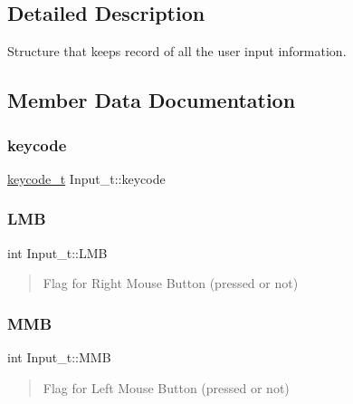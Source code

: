 \subsection{Detailed Description}
Structure that keeps record of all the user input information. 

\subsection{Member Data Documentation}
\hypertarget{struct_input__t_a1664c83ef92405877db0b04d4643a754}{}\label{struct_input__t_a1664c83ef92405877db0b04d4643a754} 
\subsubsection{\texorpdfstring{keycode}{keycode}}
{\footnotesize\ttfamily \hyperlink{group___input_ga6e68664bf6d0e0a4dac76a07ae630c52}{keycode\+\_\+t} Input\+\_\+t\+::keycode}

\hypertarget{struct_input__t_af71c02dde674d804117e7915929a3e05}{}\label{struct_input__t_af71c02dde674d804117e7915929a3e05} 
\subsubsection{\texorpdfstring{L\+MB}{LMB}}
{\footnotesize\ttfamily int Input\+\_\+t\+::\+L\+MB}



\begin{quote}
Flag for Right Mouse Button (pressed or not) \end{quote}


\hypertarget{struct_input__t_a39c2b2bb2313e0a3773c2b8cb2bc94c8}{}\label{struct_input__t_a39c2b2bb2313e0a3773c2b8cb2bc94c8} 
\subsubsection{\texorpdfstring{M\+MB}{MMB}}
{\footnotesize\ttfamily int Input\+\_\+t\+::\+M\+MB}



\begin{quote}
Flag for Left Mouse Button (pressed or not) \end{quote}


